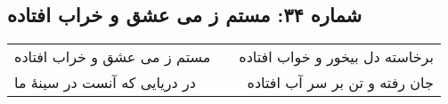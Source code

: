 \begin{center}
\section*{شماره ۳۴: مستم ز می عشق و خراب افتاده}
\label{sec:034}
\begin{longtable}{l p{0.5cm} r}
مستم ز می عشق و خراب افتاده
&&
برخاسته دل بیخور و خواب افتاده
\\
در دریایی که آنست در سینهٔ ما
&&
جان رفته و تن بر سر آب افتاده
\\
\end{longtable}
\end{center}
